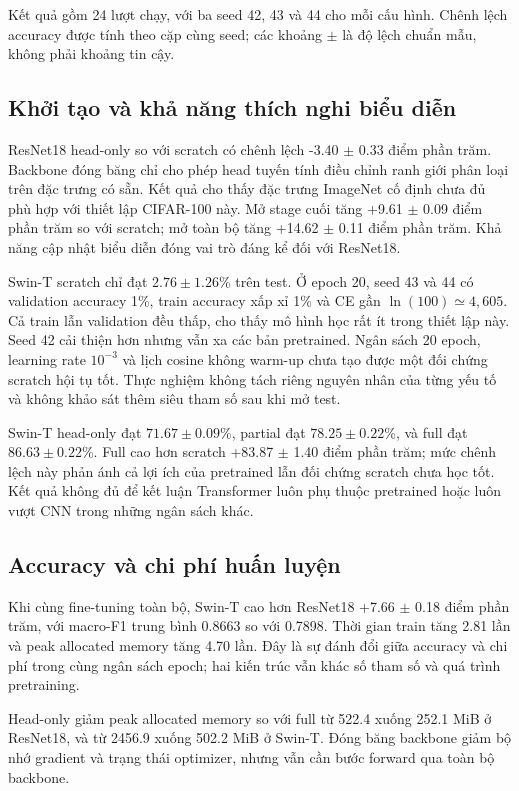 Kết quả gồm 24 lượt chạy, với ba seed 42, 43 và 44 cho mỗi cấu hình. Chênh lệch accuracy được tính theo cặp cùng seed; các khoảng $\pm$ là độ lệch chuẩn mẫu, không phải khoảng tin cậy.

\subsection{Khởi tạo và khả năng thích nghi biểu diễn}
ResNet18 head-only so với scratch có chênh lệch -3.40 $\pm$ 0.33 điểm phần trăm. Backbone đóng băng chỉ cho phép head tuyến tính điều chỉnh ranh giới phân loại trên đặc trưng có sẵn. Kết quả cho thấy đặc trưng ImageNet cố định chưa đủ phù hợp với thiết lập CIFAR-100 này. Mở stage cuối tăng +9.61 $\pm$ 0.09 điểm phần trăm so với scratch; mở toàn bộ tăng +14.62 $\pm$ 0.11 điểm phần trăm. Khả năng cập nhật biểu diễn đóng vai trò đáng kể đối với ResNet18.

Swin-T scratch chỉ đạt $2.76 \pm 1.26$\% trên test. Ở epoch 20, seed 43 và 44 có validation accuracy 1\%, train accuracy xấp xỉ 1\% và CE gần $\ln(100)\simeq4{,}605$. Cả train lẫn validation đều thấp, cho thấy mô hình học rất ít trong thiết lập này. Seed 42 cải thiện hơn nhưng vẫn xa các bản pretrained. Ngân sách 20 epoch, learning rate $10^{-3}$ và lịch cosine không warm-up chưa tạo được một đối chứng scratch hội tụ tốt. Thực nghiệm không tách riêng nguyên nhân của từng yếu tố và không khảo sát thêm siêu tham số sau khi mở test.

Swin-T head-only đạt $71.67 \pm 0.09$\%, partial đạt $78.25 \pm 0.22$\%, và full đạt $86.63 \pm 0.22$\%. Full cao hơn scratch +83.87 $\pm$ 1.40 điểm phần trăm; mức chênh lệch này phản ánh cả lợi ích của pretrained lẫn đối chứng scratch chưa học tốt. Kết quả không đủ để kết luận Transformer luôn phụ thuộc pretrained hoặc luôn vượt CNN trong những ngân sách khác.

\subsection{Accuracy và chi phí huấn luyện}
Khi cùng fine-tuning toàn bộ, Swin-T cao hơn ResNet18 +7.66 $\pm$ 0.18 điểm phần trăm, với macro-F1 trung bình 0.8663 so với 0.7898. Thời gian train tăng 2.81 lần và peak allocated memory tăng 4.70 lần. Đây là sự đánh đổi giữa accuracy và chi phí trong cùng ngân sách epoch; hai kiến trúc vẫn khác số tham số và quá trình pretraining.

Head-only giảm peak allocated memory so với full từ 522.4 xuống 252.1 MiB ở ResNet18, và từ 2456.9 xuống 502.2 MiB ở Swin-T. Đóng băng backbone giảm bộ nhớ gradient và trạng thái optimizer, nhưng vẫn cần bước forward qua toàn bộ backbone.

